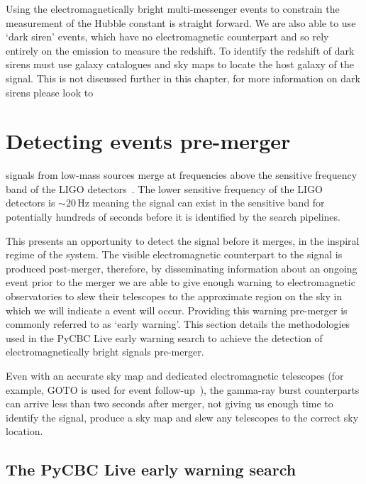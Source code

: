 Using the electromagnetically bright multi-messenger events to constrain the measurement of the Hubble constant is straight forward. We are also able to use `dark siren' events, which have no electromagnetic counterpart and so rely entirely on the \gwadj emission to measure the redshift. To identify the redshift of dark sirens must use galaxy catalogues and \gwadj sky maps to locate the host galaxy of the \gwadj signal. This is not discussed further in this chapter, for more information on dark sirens please look to~\cite{DES:2019, Dalang_dark_sirens:2023}

\section{\label{6:sec:early-warning-search}Detecting \gwadj events pre-merger}

\Gwadj signals from low-mass sources merge at frequencies above the sensitive frequency band of the LIGO \gwadj detectors~\cite{aLIGO_design_curve:2018}. The lower sensitive frequency of the LIGO detectors is ${\sim}20 \, \text{Hz}$ meaning the \gwadj signal can exist in the sensitive band for potentially hundreds of seconds before it is identified by the \gwadj search pipelines.

This presents an opportunity to detect the \gwadj signal before it merges, in the inspiral regime of the system. The visible electromagnetic counterpart to the \gwadj signal is produced post-merger, therefore, by disseminating information about an ongoing \gwadj event prior to the merger we are able to give enough warning to electromagnetic observatories to slew their telescopes to the approximate region on the sky in which we will indicate a \gwadj event will occur. Providing this warning pre-merger is commonly referred to as `early warning'. This section details the methodologies used in the PyCBC Live early warning search to achieve the detection of electromagnetically bright \gwadj signals pre-merger.

Even with an accurate sky map and dedicated electromagnetic telescopes (for example, GOTO is used for \gwadj event follow-up~\cite{GOTO:2020}), the gamma-ray burst counterparts can arrive less than two seconds after merger, not giving us enough time to identify the signal, produce a sky map and slew any telescopes to the correct sky location.

\subsection{\label{6:sec:pycbc-ew-search}The PyCBC Live early warning search}

